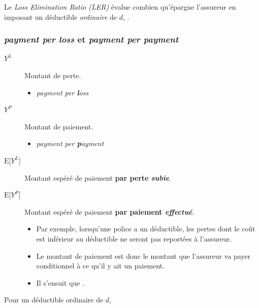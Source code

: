 \documentclass[french]{article}
\begin{document}
\begin{multicols*}{2}
\begin{definitionNOHFILLprop}
Le \og \textit{Loss Elimination Ratio (LER)} \fg{} évalue combien qu'épargne l'assureur en imposant un déductible \textit{ordinaire} de $d$,
.
\end{definitionNOHFILLprop}


\subsubsection{\og \textit{payment \textbf{per loss}} \fg{} et \og \textit{payment \textbf{per payment}} \fg{}}
\begin{distributions}[Notation]
\begin{description}
	\item[$Y^{L}$]	Montant de perte.
		\begin{itemize}
		\item	\og \textit{payment per \textbf{l}oss} \fg{}
		\end{itemize}
	\item[$Y^{P}$]	Montant de paiement.
		\begin{itemize}
		\item	\og \textit{payment per \textbf{p}ayment} \fg{}
		\end{itemize}
\end{description}
\end{distributions}

\begin{description}
	\item[$\text{E}\lbrack Y^{L} \rbrack$]	Montant espéré de paiement \textbf{par perte \textit{subie}}.
	\item[$\text{E}\lbrack Y^{P}\rbrack$]	Montant espéré de paiement \textbf{par paiement \textit{effectué}}.
		\begin{itemize}
		\item	Par exemple, lorsqu'une police a un déductible, les pertes dont le coût est inférieur au déductible ne seront pas reportées à l'assureur.
		\item	Le montant de paiement est donc le montant que l'assureur va payer conditionnel à ce qu'il y ait un paiement.
		\item	Il s'ensuit que .
		\end{itemize}
\end{description}


Pour un déductible ordinaire de $d$, 


\end{multicols*}
\end{document}
